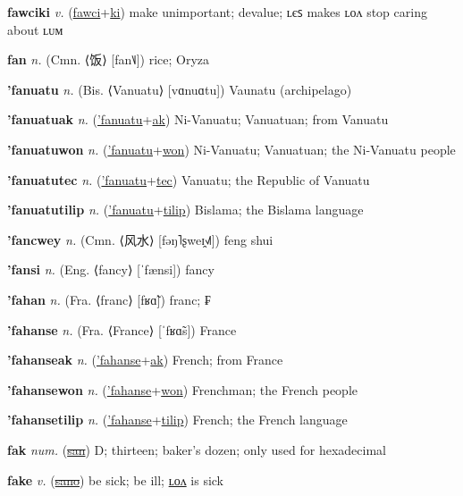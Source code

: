 \textbf{\hypertarget{fawciki}{fawciki}} \textit{v.} (\hyperlink{fawci}{fawci}+\allowbreak \hyperlink{ki}{ki})
make unimportant; devalue; ʟєꜱ makes ʟᴏᴧ stop caring about ʟᴜᴍ

\textbf{\hypertarget{fan}{fan}} \textit{n.} (Cmn. ⟨{\chinese{}饭}⟩ [fan˥˩])
rice; Oryza

\textbf{\hypertarget{'fanuatu}{'fanuatu}} \textit{n.} (Bis. ⟨Vanuatu⟩ [vɑnuɑtu])
Vaunatu (archipelago)

\textbf{\hypertarget{'fanuatuak}{'fanuatuak}} \textit{n.} (\hyperlink{'fanuatu}{'fanuatu}+\allowbreak \hyperlink{ak}{ak})
Ni-Vanuatu; Vanuatuan; from Vanuatu

\textbf{\hypertarget{'fanuatuwon}{'fanuatuwon}} \textit{n.} (\hyperlink{'fanuatu}{'fanuatu}+\allowbreak \hyperlink{won}{won})
Ni-Vanuatu; Vanuatuan; the Ni-Vanuatu people

\textbf{\hypertarget{'fanuatutec}{'fanuatutec}} \textit{n.} (\hyperlink{'fanuatu}{'fanuatu}+\allowbreak \hyperlink{tec}{tec})
Vanuatu; the Republic of Vanuatu

\textbf{\hypertarget{'fanuatutilip}{'fanuatutilip}} \textit{n.} (\hyperlink{'fanuatu}{'fanuatu}+\allowbreak \hyperlink{tilip}{tilip})
Bislama; the Bislama language

\textbf{\hypertarget{'fancwey}{'fancwey}} \textit{n.} (Cmn. ⟨{\chinese{}风水}⟩ [fəŋ˥ʂweɪ̯˧˩˥])
feng shui

\textbf{\hypertarget{'fansi}{'fansi}} \textit{n.} (Eng. ⟨fancy⟩ [ˈfænsi])
fancy

\textbf{\hypertarget{'fahan}{'fahan}} \textit{n.} (Fra. ⟨franc⟩ [fʁɑ̃])
franc; ₣

\textbf{\hypertarget{'fahanse}{'fahanse}} \textit{n.} (Fra. ⟨France⟩ [ˈfʁɑ̃s])
France

\textbf{\hypertarget{'fahanseak}{'fahanseak}} \textit{n.} (\hyperlink{'fahanse}{'fahanse}+\allowbreak \hyperlink{ak}{ak})
French; from France

\textbf{\hypertarget{'fahansewon}{'fahansewon}} \textit{n.} (\hyperlink{'fahanse}{'fahanse}+\allowbreak \hyperlink{won}{won})
Frenchman; the French people

\textbf{\hypertarget{'fahansetilip}{'fahansetilip}} \textit{n.} (\hyperlink{'fahanse}{'fahanse}+\allowbreak \hyperlink{tilip}{tilip})
French; the French language

\textbf{\hypertarget{fak}{fak}} \textit{num.} (\hyperlink{san}{\sout{san}})
D; thirteen; baker’s dozen; only used for hexadecimal

\textbf{\hypertarget{fake}{fake}} \textit{v.} (\hyperlink{sano}{\sout{sano}})
be sick; be ill; \hyperlink{fakelon}{ʟᴏᴧ} is sick

